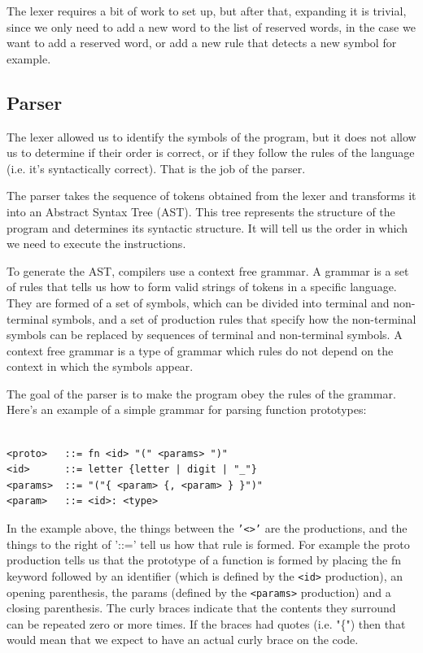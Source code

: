 ﻿\documentclass[10pt,a4paper,twocolumn,twoside]{article}
\begin{document}
The lexer requires a bit of work to set up, but after that, expanding it is 
trivial, since we only need to add a new word to the list of reserved words, in 
the case we want to add a reserved word, or add a new rule that detects a new 
symbol for example.


\subsection{Parser}
The lexer allowed us to identify the symbols of the program, but it does not 
allow us to determine if their order is correct, or if they follow the rules of
the language (i.e. it's syntactically correct). That is the job of the parser.

The parser takes the sequence of tokens obtained from the lexer and
transforms it into an Abstract Syntax Tree (AST). This tree represents the
structure of the program and determines its syntactic structure. It will tell us
the order in which we need to execute the instructions.

To generate the AST, compilers use a context free grammar. A grammar is a set of
rules that tells us how to form valid strings of tokens in a specific language.
They are formed of a set of symbols, which can be divided into terminal and
non-terminal symbols, and a set of production rules that specify how the
non-terminal symbols can be replaced by sequences of terminal and non-terminal
symbols. A context free grammar is a type of grammar which rules do not depend
on the context in which the symbols appear.

The goal of the parser is to make the program obey the rules of the grammar.
Here's an example of a simple grammar for parsing function prototypes:

\begin{small}
\begin{verbatim}

<proto>   ::= fn <id> "(" <params> ")"
<id>      ::= letter {letter | digit | "_"}
<params>  ::= "("{ <param> {, <param> } }")"
<param>   ::= <id>: <type>

\end{verbatim}
\end{small}

In the example above, the things between the \texttt{'<>'} are the productions,
and the things to the right of '::=' tell us how that rule is formed. For
example the proto production tells us that the prototype of a function is formed
by placing the fn keyword followed by an identifier (which is defined by the
\texttt{<id>} production), an opening parenthesis, the params (defined by the
\texttt{<params>} production) and a closing parenthesis. The curly braces 
indicate that the contents they surround can be repeated zero or more times. 
If the braces had quotes (i.e. "\{") then that would mean that we expect to have 
an actual curly brace on the code.
\end{document}
